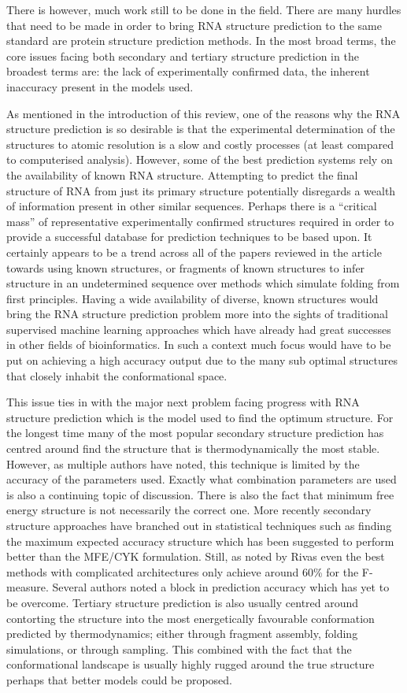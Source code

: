 \documentclass[journal]{IEEEtran}
\begin{document}
There is however, much work still to be done in the field. There are many hurdles that need to be made in order to bring RNA structure prediction to the same standard are protein structure prediction methods. In the most broad terms, the core issues facing both secondary and tertiary structure prediction in the broadest terms are: the lack of experimentally confirmed data, the inherent inaccuracy present in the models used.

As mentioned in the introduction of this review, one of the reasons why the RNA structure prediction is so desirable is that the experimental determination of the structures to atomic resolution is a slow and costly processes (at least compared to computerised analysis). However, some of the best prediction systems rely on the availability of known RNA structure. Attempting to predict the final structure of RNA from just its primary structure potentially disregards a wealth of information present in other similar sequences. Perhaps there is a ``critical mass'' of representative experimentally confirmed structures required in order to provide a successful database for prediction techniques to be based upon. It certainly appears to be a trend across all of the papers reviewed in the article towards using known structures, or fragments of known structures to infer structure in an undetermined sequence over methods which simulate folding from first principles. Having a wide availability of diverse, known structures would bring the RNA structure prediction problem more into the sights of traditional supervised machine learning approaches which have already had great successes in other fields of bioinformatics. In such a context much focus would have to be put on achieving a high accuracy output due to the many sub optimal structures that closely inhabit the conformational space.

This issue ties in with the major next problem facing progress with RNA structure prediction which is the model used to find the optimum structure. For the longest time many of the most popular secondary structure prediction has centred around find the structure that is thermodynamically the most stable. However, as multiple authors have noted, this technique is limited by the accuracy of the parameters used. Exactly what combination parameters are used is also a continuing topic of discussion. There is also the fact that minimum free energy structure is not necessarily the correct one. More recently secondary structure approaches have branched out in statistical techniques such as finding the maximum expected accuracy structure which has been suggested to perform better than the MFE/CYK formulation. Still, as noted by Rivas \cite{rivas2013four} even the best methods with complicated architectures only achieve around 60\% for the F-measure. Several authors noted a block in prediction accuracy which has yet to be overcome. Tertiary structure prediction is also usually centred around contorting the structure into the most energetically favourable conformation predicted by thermodynamics; either through fragment assembly, folding simulations, or through sampling. This combined with the fact that the conformational landscape is usually highly rugged around the true structure perhaps that better models could be proposed. 
\end{document}
